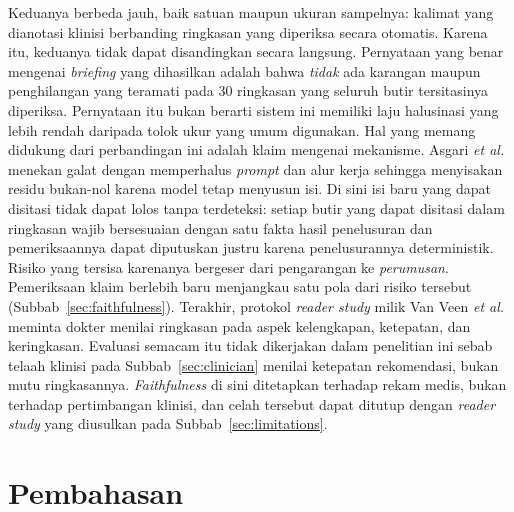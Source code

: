Keduanya berbeda jauh, baik satuan maupun ukuran sampelnya: kalimat yang dianotasi klinisi
berbanding ringkasan yang diperiksa secara otomatis. Karena itu, keduanya tidak dapat
disandingkan secara langsung. Pernyataan yang benar mengenai \emph{briefing} yang dihasilkan
adalah bahwa \emph{tidak} ada karangan maupun penghilangan yang teramati pada 30 ringkasan
yang seluruh butir tersitasinya diperiksa. Pernyataan itu bukan berarti sistem ini memiliki laju halusinasi yang lebih
rendah daripada tolok ukur yang umum digunakan. Hal yang memang didukung dari
perbandingan ini adalah klaim mengenai mekanisme. Asgari \textit{et al.} menekan galat dengan
memperhalus \emph{prompt} dan alur kerja sehingga menyisakan residu bukan-nol karena model
tetap menyusun isi. Di sini isi baru yang dapat disitasi tidak dapat lolos tanpa terdeteksi:
setiap butir yang dapat disitasi dalam ringkasan wajib bersesuaian dengan satu fakta hasil
penelusuran dan pemeriksaannya dapat diputuskan justru karena penelusurannya deterministik.
Risiko yang tersisa karenanya bergeser dari pengarangan ke \emph{perumusan}. Pemeriksaan klaim
berlebih baru menjangkau satu pola dari risiko tersebut (Subbab~\ref{sec:faithfulness}). Terakhir, protokol \emph{reader study} milik Van Veen \textit{et al.}~\cite{vanveen2023}
meminta dokter menilai ringkasan pada aspek kelengkapan, ketepatan, dan keringkasan.
Evaluasi semacam itu tidak dikerjakan dalam penelitian ini sebab telaah klinisi pada
Subbab~\ref{sec:clinician} menilai ketepatan rekomendasi, bukan mutu ringkasannya.
\emph{Faithfulness} di sini
ditetapkan terhadap rekam medis, bukan terhadap pertimbangan klinisi, dan celah tersebut
dapat ditutup dengan \emph{reader study} yang diusulkan pada Subbab~\ref{sec:limitations}.

\section{Pembahasan}

